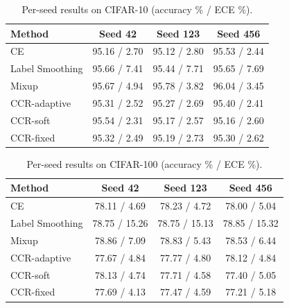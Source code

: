 \documentclass{article}
\begin{document}
\begin{table}[h]
\caption{Per-seed results on CIFAR-10 (accuracy \% / ECE \%).}
\label{tab:per_seed_cifar10}
\centering
\small
\begin{tabular}{lccc}
\toprule
Method & Seed 42 & Seed 123 & Seed 456 \\
\midrule
CE & 95.16 / 2.70 & 95.12 / 2.80 & 95.53 / 2.44 \\
Label Smoothing & 95.66 / 7.41 & 95.44 / 7.71 & 95.65 / 7.69 \\
Mixup & 95.67 / 4.94 & 95.78 / 3.82 & 96.04 / 3.45 \\
CCR-adaptive & 95.31 / 2.52 & 95.27 / 2.69 & 95.40 / 2.41 \\
CCR-soft & 95.54 / 2.31 & 95.17 / 2.57 & 95.16 / 2.60 \\
CCR-fixed & 95.32 / 2.49 & 95.19 / 2.73 & 95.30 / 2.62 \\
\bottomrule
\end{tabular}
\end{table}

\begin{table}[h]
\caption{Per-seed results on CIFAR-100 (accuracy \% / ECE \%).}
\label{tab:per_seed_cifar100}
\centering
\small
\begin{tabular}{lccc}
\toprule
Method & Seed 42 & Seed 123 & Seed 456 \\
\midrule
CE & 78.11 / 4.69 & 78.23 / 4.72 & 78.00 / 5.04 \\
Label Smoothing & 78.75 / 15.26 & 78.75 / 15.13 & 78.85 / 15.32 \\
Mixup & 78.86 / 7.09 & 78.83 / 5.43 & 78.53 / 6.44 \\
CCR-adaptive & 77.67 / 4.84 & 77.77 / 4.80 & 78.12 / 4.84 \\
CCR-soft & 78.13 / 4.74 & 77.71 / 4.58 & 77.40 / 5.05 \\
CCR-fixed & 77.69 / 4.13 & 77.47 / 4.59 & 77.21 / 5.18 \\
\bottomrule
\end{tabular}
\end{table}
\end{document}

